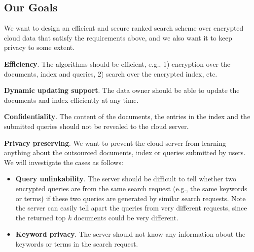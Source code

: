 \documentclass{IEEEtran}
\begin{document}
\subsection{Our Goals}
We want to design an efficient and secure ranked search scheme over encrypted cloud data that satisfy the requirements above, and we also want it to keep privacy to some extent.

\textbf{Efficiency}. The algorithms should be efficient, e.g., 1) encryption over the documents, index and queries, 2) search over the encrypted index, etc.

\textbf{Dynamic updating support}. The data owner should be able to update the documents and index efficiently at any time.

\textbf{Confidentiality}. The content of the documents, the entries in the index and the submitted queries should not be revealed to the cloud server.

\textbf{Privacy preserving}. We want to prevent the cloud server from learning anything about the outsourced documents, index or queries submitted by users. We will investigate the cases as follows:
\begin{itemize}
\item \textbf{Query unlinkability}. The server should be difficult to tell whether two encrypted queries are from the same search request (e.g., the same keywords or terms) if these two queries are generated by similar search requests. Note the server can easily tell apart the queries from very different requests, since the returned top $k$ documents could be very different.
\item \textbf{Keyword privacy}. The server should not know any information about the keywords or terms in the search request.
\end{itemize}
\end{document}
